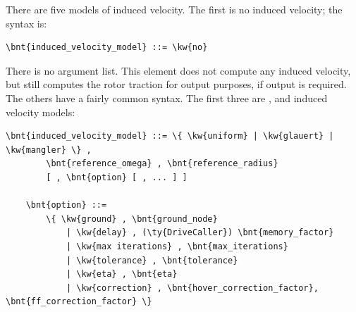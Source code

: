 There are five models of induced velocity. 
The first is no induced velocity; the syntax is:
\begin{Verbatim}[commandchars=\\\{\}]
    \bnt{induced_velocity_model} ::= \kw{no}
\end{Verbatim}
There is no argument list. This element does not compute any induced
velocity, but still computes the rotor traction for output purposes,
if output is required.
The others have a fairly common syntax.  The first three are
,  and  induced velocity
models:
\begin{Verbatim}[commandchars=\\\{\}]
    \bnt{induced_velocity_model} ::= \{ \kw{uniform} | \kw{glauert} | \kw{mangler} \} , 
        \bnt{reference_omega} , \bnt{reference_radius}
        [ , \bnt{option} [ , ... ] ]

    \bnt{option} ::=
        \{ \kw{ground} , \bnt{ground_node}
            | \kw{delay} , (\ty{DriveCaller}) \bnt{memory_factor}
            | \kw{max iterations} , \bnt{max_iterations}
            | \kw{tolerance} , \bnt{tolerance}
            | \kw{eta} , \bnt{eta}
            | \kw{correction} , \bnt{hover_correction_factor}, \bnt{ff_correction_factor} \}
\end{Verbatim}

